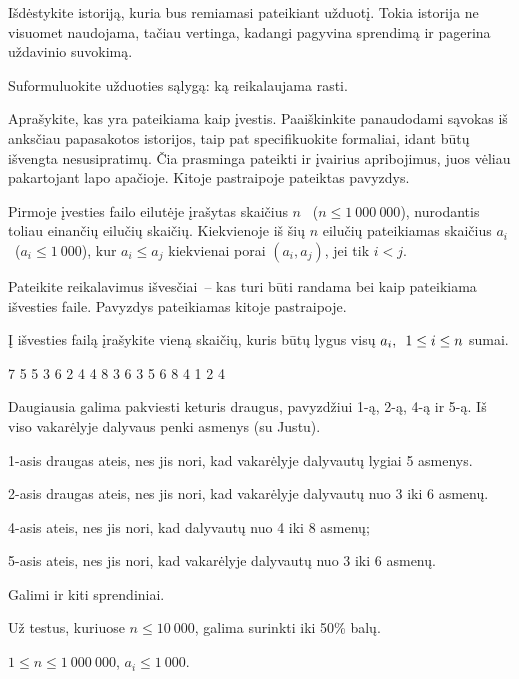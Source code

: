 \documentclass{liostyle}
\newcommand{\maxN}{1\ 000\ 000}
\newcommand{\maxA}{1\ 000}
\begin{document}
Išdėstykite istoriją, kuria bus remiamasi pateikiant užduotį. Tokia
istorija ne visuomet naudojama, tačiau vertinga, kadangi pagyvina
sprendimą ir pagerina uždavinio suvokimą.

\Task
Suformuluokite užduoties sąlygą: ką reikalaujama rasti.

\Input
Aprašykite, kas yra pateikiama kaip įvestis. Paaiškinkite panaudodami
sąvokas iš anksčiau papasakotos istorijos, taip pat specifikuokite
formaliai, idant būtų išvengta nesusipratimų. Čia prasminga pateikti
ir įvairius apribojimus, juos vėliau pakartojant lapo apačioje. Kitoje
pastraipoje pateiktas pavyzdys.

Pirmoje įvesties failo eilutėje įrašytas skaičius $n$~%
($n\le\maxN$), nurodantis toliau einančių eilučių skaičių.
Kiekvienoje iš šių $n$ eilučių pateikiamas skaičius $a_i$~($a_i\le\maxA$),
kur $a_i\le a_j$ kiekvienai porai $(a_i, a_j)$, jei tik $i<j$.

\Output
Pateikite reikalavimus išvesčiai~-- kas turi būti randama bei kaip
pateikiama išvesties faile. Pavyzdys pateikiamas kitoje pastraipoje.

Į išvesties failą įrašykite vieną skaičių, kuris būtų lygus
visų $a_i,\enskip 1\le i\le n$ sumai.

\Examples
\example%
{
7
5 5
3 6
2 4
4 8
3 6
3 5
6 8
}%
{
4
1
2
4
}%
{
Daugiausia galima pakviesti keturis draugus,
pavyzdžiui 1-ą, 2-ą, 4-ą ir 5-ą. Iš
viso vakarėlyje dalyvaus penki asmenys (su
Justu).

1-asis draugas ateis, nes jis nori, kad
vakarėlyje dalyvautų lygiai 5 asmenys. 

2-asis draugas ateis, nes jis nori, kad
vakarėlyje dalyvautų nuo 3 iki 6 asmenų. 

4-asis ateis, nes jis nori, kad dalyvautų nuo
4 iki 8 asmenų;

5-asis ateis, nes jis nori, kad vakarėlyje
dalyvautų nuo 3 iki 6 asmenų.

Galimi ir kiti sprendiniai.
}

\Grading
Už testus, kuriuose $n \le 10\ 000$, galima surinkti iki 50\% balų.

\Constraints
$1\le n \le \maxN$,\enskip
$a_i\le\maxA$.
\end{document}
